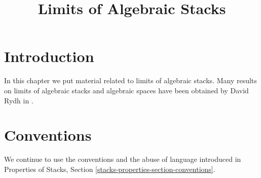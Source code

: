 

%


\title{Limits of Algebraic Stacks}


\maketitle

\label{section-phantom}

\tableofcontents

\section{Introduction}
\label{section-introduction}

\noindent
In this chapter we put material related to limits of algebraic stacks.
Many results on limits of algebraic stacks and algebraic spaces
have been obtained by David Rydh in \cite{rydh_approx}.


\section{Conventions}
\label{section-conventions}

\noindent
We continue to use the conventions and the abuse of language
introduced in
Properties of Stacks, Section \ref{stacks-properties-section-conventions}.












